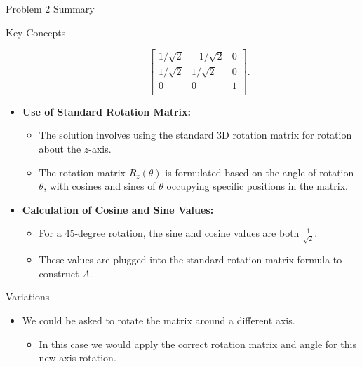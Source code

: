 \begin{summary}{Problem 2 Summary}
\begin{statement}{Key Concepts}
\begin{itemize}
\begin{itemize}
                \begin{equation*}
                    \begin{bmatrix}
                        1 / \sqrt{2} & -1 / \sqrt{2} & 0 \\
                        1 / \sqrt{2} & 1 / \sqrt{2} & 0 \\
                        0 & 0 & 1 \\
                    \end{bmatrix}.
                \end{equation*}
            \end{itemize}
            \item \textbf{Use of Standard Rotation Matrix:}
            \begin{itemize}
                \item The solution involves using the standard 3D rotation matrix for rotation about the $z$-axis.
                \item The rotation matrix $R_{z}(\theta)$ is formulated based on the angle of rotation $\theta$, with cosines and sines of $\theta$ occupying specific positions in the matrix.
            \end{itemize}
            \item \textbf{Calculation of Cosine and Sine Values:}
            \begin{itemize}
                \item For a 45-degree rotation, the sine and cosine values are both $\frac{1}{\sqrt{2}}$.
                \item These values are plugged into the standard rotation matrix formula to construct $A$.
            \end{itemize}
        \end{itemize}
    \end{statement}
    \begin{statement}{Variations}
        \begin{itemize}
            \item We could be asked to rotate the matrix around a different axis.
            \begin{itemize}
                \item In this case we would apply the correct rotation matrix and angle for this new axis rotation.
            \end{itemize}
        \end{itemize}
    \end{statement}
\end{summary}

